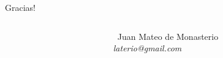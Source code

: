 \documentclass{beamer}
\begin{document}

\begin{frame}{Gracias! }
	\begin{columns}
		\begin{column}{0.20 \textwidth}
		\end{column}
		\begin{column}{0.55 \textwidth}
				\center\
				Juan Mateo de Monasterio \\
				\textit{laterio@gmail.com} \\
		\end{column}
	\end{columns}
\end{frame}


\justifying%




\vfill
\end{document}
